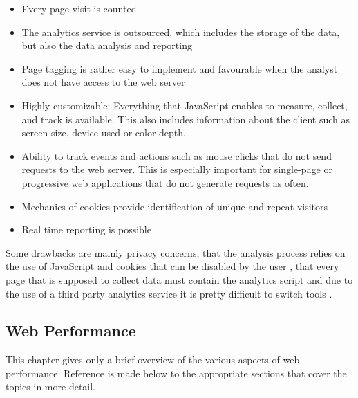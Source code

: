 \begin{itemize}
\item Every page visit is counted %
\item The analytics service is outsourced, which includes the storage of the data, but also the data analysis and reporting %
\item Page tagging is rather easy to implement and favourable when the analyst does not have access to the web server %
\item Highly customizable: Everything that JavaScript enables to measure, collect, and track is available. This also includes information about the client such as screen size, device used or color depth. %
\item Ability to track events and actions such as mouse clicks that do not send requests to the web server. This is especially important for single-page or progressive web applications that do not generate requests as often.  %
\item Mechanics of cookies provide identification of unique and repeat visitors %
\item Real time reporting is possible %
\end{itemize}


Some drawbacks are mainly privacy concerns, that the analysis process relies on the use of JavaScript and cookies that can be disabled by the user \cite{2011Marek}, that every page that is supposed to collect data must contain the analytics script and due to the use of a third party analytics service it is pretty difficult to switch tools \cite{2014Singal}.








\subsection{Web Performance}
\label{chapter:web_performance}

This chapter gives only a brief overview of the various aspects of web performance.
Reference is made below to the appropriate sections that cover the topics in more detail.

